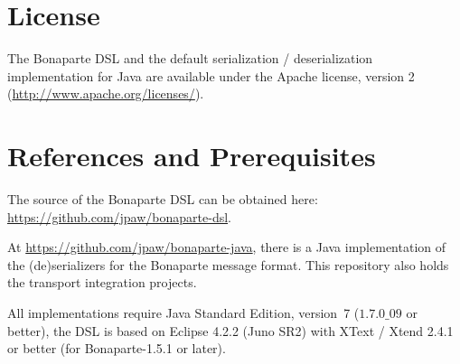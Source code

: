\documentclass[11pt,a4paper,oneside]{article}
\begin{document}
\section{License}
The Bonaparte DSL and the default serialization / deserialization implementation for Java
are available under the Apache license, version 2 (\url{http://www.apache.org/licenses/}). 

\section{References and Prerequisites}
The source of the Bonaparte DSL can be obtained here: \url{https://github.com/jpaw/bonaparte-dsl}.

At \url{https://github.com/jpaw/bonaparte-java}, there is a Java implementation of the (de)serializers for the Bonaparte message format. This repository also holds the transport integration projects.

All implementations require Java Standard Edition, version~7 ($1.7.0\_09$ or better), the DSL is based on Eclipse 4.2.2 (Juno
SR2) with XText / Xtend 2.4.1 or better (for Bonaparte-1.5.1 or later).
\end{document}
